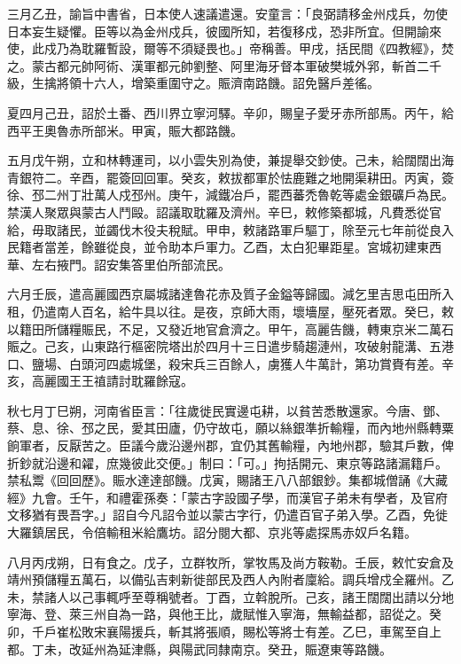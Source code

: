 \begin{pinyinscope}
 三月乙丑，諭旨中書省，日本使人速議遣還。安童言：「良弼請移金州戍兵，勿使日本妄生疑懼。臣等以為金州戍兵，彼國所知，若復移戍，恐非所宜。但開諭來使，此戍乃為耽羅暫設，爾等不須疑畏也。」帝稱善。甲戌，括民間《四教經》，焚之。蒙古都元帥阿術、漢軍都元帥劉整、阿里海牙督本軍破樊城外郛，斬首二千級，生擒將領十六人，增築重圍守之。賑濟南路饑。詔免醫戶差徭。



 夏四月己丑，詔於土番、西川界立寧河驛。辛卯，賜皇子愛牙赤所部馬。丙午，給西平王奧魯赤所部米。甲寅，賑大都路饑。



 五月戊午朔，立和林轉運司，以小雲失別為使，兼提舉交鈔使。己未，給闊闊出海青銀符二。辛酉，罷簽回回軍。癸亥，敕拔都軍於怯鹿難之地開渠耕田。丙寅，簽徐、邳二州丁壯萬人戍邳州。庚午，減鐵冶戶，罷西蕃禿魯乾等處金銀礦戶為民。禁漢人聚眾與蒙古人鬥毆。詔議取耽羅及濟州。辛巳，敕修築都城，凡費悉從官給，毋取諸民，並蠲伐木役夫稅賦。甲申，敕諸路軍戶驅丁，除至元七年前從良入民籍者當差，餘雖從良，並令助本戶軍力。乙酉，太白犯畢距星。宮城初建東西華、左右掖門。詔安集答里伯所部流民。



 六月壬辰，遣高麗國西京屬城諸達魯花赤及質子金鎰等歸國。減乞里吉思屯田所入租，仍遣南人百名，給牛具以往。是夜，京師大雨，壞墻屋，壓死者眾。癸巳，敕以籍田所儲糧賑民，不足，又發近地官倉濟之。甲午，高麗告饑，轉東京米二萬石賑之。己亥，山東路行樞密院塔出於四月十三日遣步騎趨漣州，攻破射龍溝、五港口、鹽場、白頭河四處城堡，殺宋兵三百餘人，虜獲人牛萬計，第功賞賚有差。辛亥，高麗國王王禃請討耽羅餘寇。



 秋七月丁巳朔，河南省臣言：「往歲徙民實邊屯耕，以貧苦悉散還家。今唐、鄧、蔡、息、徐、邳之民，愛其田廬，仍守故屯，願以絲銀準折輸糧，而內地州縣轉粟餉軍者，反厭苦之。臣議今歲沿邊州郡，宜仍其舊輸糧，內地州郡，驗其戶數，俾折鈔就沿邊和糴，庶幾彼此交便。」制曰：「可。」拘括開元、東京等路諸漏籍戶。禁私鬻《回回歷》。賑水達達部饑。戊寅，賜諸王八八部銀鈔。集都城僧誦《大藏經》九會。壬午，和禮霍孫奏：「蒙古字設國子學，而漢官子弟未有學者，及官府文移猶有畏吾字。」詔自今凡詔令並以蒙古字行，仍遣百官子弟入學。乙酉，免徙大羅鎮居民，令倍輸租米給鷹坊。詔分閱大都、京兆等處探馬赤奴戶名籍。



 八月丙戌朔，日有食之。戊子，立群牧所，掌牧馬及尚方鞍勒。壬辰，敕忙安倉及靖州預儲糧五萬石，以備弘吉剌新徙部民及西人內附者廩給。調兵增戍全羅州。乙未，禁諸人以己事輒呼至尊稱號者。丁酉，立斡脫所。己亥，諸王闊闊出請以分地寧海、登、萊三州自為一路，與他王比，歲賦惟入寧海，無輸益都，詔從之。癸卯，千戶崔松敗宋襄陽援兵，斬其將張順，賜松等將士有差。乙巳，車駕至自上都。丁未，改延州為延津縣，與陽武同隸南京。癸丑，賑遼東等路饑。




\end{pinyinscope}
